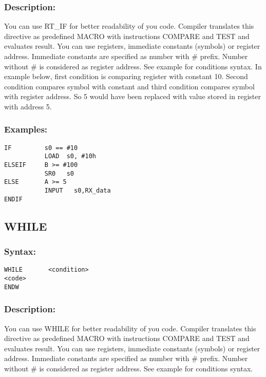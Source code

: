         \subsubsection{Description:}
            You can use RT\_IF for better readability of you code. Compiler translates this directive as predefined MACRO with instructions COMPARE and TEST and evaluates result. You can use registers, immediate constants (symbols) or register address. Immediate constants are specified as number with \# prefix. Number without \# is considered as register address. See example for conditions syntax. In example below, first condition is comparing register with constant 10. Second condition compares symbol with constant and third condition compares symbol with register address. So 5 would have been replaced with value stored in register with address 5.

        \subsubsection{Examples:}
        {
            \usecodefont
            \verb'IF         s0 == #10'\\
            \verb'           LOAD  s0, #10h'\\
            \verb'ELSEIF     B >= #100'\\
            \verb'           SR0   s0'\\
            \verb'ELSE       A >= 5'\\
            \verb'           INPUT   s0,RX_data'\\
            \verb'ENDIF'
        }

    \subsection{WHILE}
        \subsubsection{Syntax:}
        {
            \usecodefont
            \verb'WHILE       <condition>'\\
            \verb'<code>'\\
            \verb'ENDW'
        }\\

        \subsubsection{Description:}
        You can use WHILE for better readability of you code. Compiler translates this directive as predefined MACRO with instructions COMPARE and TEST and evaluates result. You can use registers, immediate constants (symbols) or register address. Immediate constants are specified as number with \# prefix. Number without \# is considered as register address. See example for conditions syntax.

